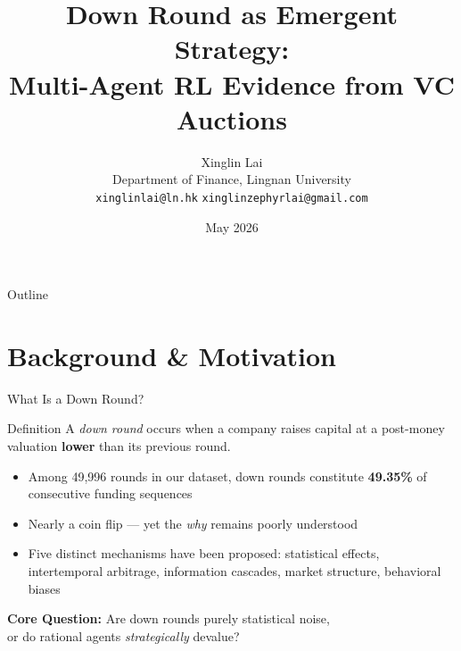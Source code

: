 \documentclass[aspectratio=169]{beamer}
\title[Down Round as Emergent Strategy]{Down Round as Emergent Strategy:\\Multi-Agent RL Evidence from VC Auctions}
\author{Xinglin Lai\\[0.2em]
  \small Department of Finance, Lingnan University\\
  \small \texttt{xinglinlai@ln.hk} \quad \texttt{xinglinzephyrlai@gmail.com}}
\institute{Course: Artificial Intelligence for Business Research}
\date{May 2026}
\begin{document}
\begin{frame}
  \titlepage
\end{frame}

\begin{frame}{Outline}
  \tableofcontents[hideallsubsections]
\end{frame}

\section{Background \& Motivation}

\begin{frame}{What Is a Down Round?}
  \begin{block}{Definition}
    A \emph{down round} occurs when a company raises capital at a post-money valuation \textbf{lower} than its previous round.
  \end{block}

  \vspace{0.3cm}
  \begin{itemize}
    \item Among 49,996 rounds in our dataset, down rounds constitute \textbf{49.35\%} of consecutive funding sequences
    \item Nearly a coin flip --- yet the \emph{why} remains poorly understood
    \item Five distinct mechanisms have been proposed: statistical effects, intertemporal arbitrage, information cascades, market structure, behavioral biases
  \end{itemize}

  \vspace{0.3cm}
  \begin{center}
    \textbf{Core Question:} Are down rounds purely statistical noise,\\
    or do rational agents \emph{strategically} devalue?
  \end{center}
\end{frame}
\end{document}
